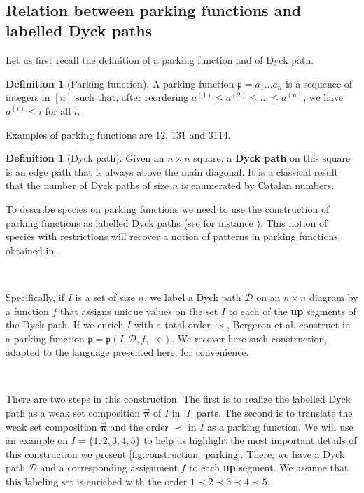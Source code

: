 \documentclass[12pt, reqno]{amsart}
\theoremstyle{definition}
\newtheorem{defin}[thm]{Definition}
\newcommand{\opi}{\vec{\boldsymbol{\pi}}}
\begin{document}
\

\subsection{Relation between parking functions and labelled Dyck paths}

Let us first recall the definition of a parking function and of  Dyck path.

\begin{defin}[Parking function]
A parking function $\mathfrak{p} = a_1 \dots a_n$ is a sequence of integers in $[n]$ such that, after reordering $a^{(1)} \leq a^{(2)} \leq \dots \leq a^{(n)}$, we have $a^{(i)} \leq i$ for all $i$.
\end{defin}

Examples of parking functions are $12$, $131$ and $3114$.

\begin{defin}[Dyck path]
Given an $n\times n$ square, a \textbf{Dyck path} on this square is an edge path that is always above the main diagonal.
It is a classical result that the number of Dyck paths of size $n$ is enumerated by Catalan numbers.
\end{defin}


To describe species on parking functions we need to use the construction of parking functions as labelled Dyck paths (see for instance \cite{Loehr}).
This notion of species with restrictions will recover a notion of patterns in parking functions obtained in \cite{adeniran2022pattern}.

\

Specifically, if $I$ is a set of size $n$, we label a Dyck path $\mathcal D$ on an $n\times n$ diagram by a function $f$ that assigns unique values on the set $I$ to each of the \textbf{up} segments of the Dyck path.
If we enrich $I$ with a total order $\prec$, Bergeron et.al. construct in \cite{BGLPV2021} a parking function $\mathfrak{p} = \mathfrak{p}(I, \mathcal D, f, \prec) $.
We recover here such construction, adapted to the language presented here, for convenience.

\

There are two steps in this construction.
The first is to realize the labelled Dyck path as a weak set composition $\opi$ of $I$ in $|I|$ parts. The second is to translate the weak set composition $\opi$ and the order $\prec $ in $I$ as a parking function.
We will use an example on $I = \{1, 2, 3, 4, 5\}$ to help us highlight the most important details of this construction we present \cref{fig:construction_parking}.
There, we have a Dyck path $\mathcal D$ and a corresponding assignment $f$ to each \textbf{up} segment.
We assume that this labeling set is enriched with the order $1 \prec 2 \prec 3 \prec 4 \prec 5$.
\end{document}
